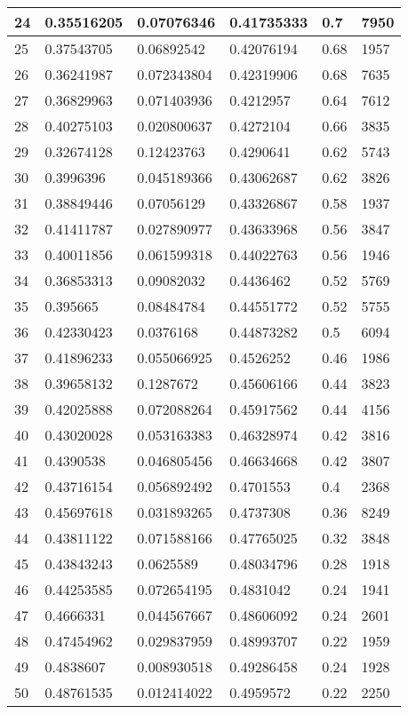 \begin{longtable}{|l|l|l|l|l|l|}
24 & 0.35516205 & 0.07076346 & 0.41735333 & 0.7 & 7950 \\ \hline 
25 & 0.37543705 & 0.06892542 & 0.42076194 & 0.68 & 1957 \\ \hline 
26 & 0.36241987 & 0.072343804 & 0.42319906 & 0.68 & 7635 \\ \hline 
27 & 0.36829963 & 0.071403936 & 0.4212957 & 0.64 & 7612 \\ \hline 
28 & 0.40275103 & 0.020800637 & 0.4272104 & 0.66 & 3835 \\ \hline 
29 & 0.32674128 & 0.12423763 & 0.4290641 & 0.62 & 5743 \\ \hline 
30 & 0.3996396 & 0.045189366 & 0.43062687 & 0.62 & 3826 \\ \hline 
31 & 0.38849446 & 0.07056129 & 0.43326867 & 0.58 & 1937 \\ \hline 
32 & 0.41411787 & 0.027890977 & 0.43633968 & 0.56 & 3847 \\ \hline 
33 & 0.40011856 & 0.061599318 & 0.44022763 & 0.56 & 1946 \\ \hline 
34 & 0.36853313 & 0.09082032 & 0.4436462 & 0.52 & 5769 \\ \hline 
35 & 0.395665 & 0.08484784 & 0.44551772 & 0.52 & 5755 \\ \hline 
36 & 0.42330423 & 0.0376168 & 0.44873282 & 0.5 & 6094 \\ \hline 
37 & 0.41896233 & 0.055066925 & 0.4526252 & 0.46 & 1986 \\ \hline 
38 & 0.39658132 & 0.1287672 & 0.45606166 & 0.44 & 3823 \\ \hline 
39 & 0.42025888 & 0.072088264 & 0.45917562 & 0.44 & 4156 \\ \hline 
40 & 0.43020028 & 0.053163383 & 0.46328974 & 0.42 & 3816 \\ \hline 
41 & 0.4390538 & 0.046805456 & 0.46634668 & 0.42 & 3807 \\ \hline 
42 & 0.43716154 & 0.056892492 & 0.4701553 & 0.4 & 2368 \\ \hline 
43 & 0.45697618 & 0.031893265 & 0.4737308 & 0.36 & 8249 \\ \hline 
44 & 0.43811122 & 0.071588166 & 0.47765025 & 0.32 & 3848 \\ \hline 
45 & 0.43843243 & 0.0625589 & 0.48034796 & 0.28 & 1918 \\ \hline 
46 & 0.44253585 & 0.072654195 & 0.4831042 & 0.24 & 1941 \\ \hline 
47 & 0.4666331 & 0.044567667 & 0.48606092 & 0.24 & 2601 \\ \hline 
48 & 0.47454962 & 0.029837959 & 0.48993707 & 0.22 & 1959 \\ \hline 
49 & 0.4838607 & 0.008930518 & 0.49286458 & 0.24 & 1928 \\ \hline 
50 & 0.48761535 & 0.012414022 & 0.4959572 & 0.22 & 2250 \\ \hline 
\end{longtable}